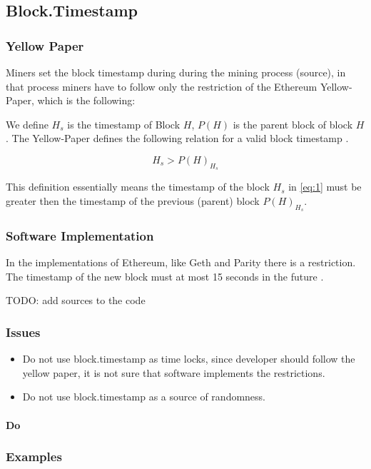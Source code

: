 \subsection{Block.Timestamp}

\subsubsection{Yellow Paper}

Miners set the block timestamp during during the mining process (source), in
that process miners have to follow only the restriction of the Ethereum
Yellow-Paper, which is the following:

We define $H_s$ is the timestamp of Block $H$, $P(H)$ is the parent
block of block $H$. The Yellow-Paper defines the following relation for a valid
block timestamp \cite{ethyellowpaper2023}.

\begin{equation} \label{eq:1}
H_s > P(H)_{H_s}
\end{equation}

This definition essentially means the timestamp of the block $H_s$ in
\ref{eq:1} must be greater then the timestamp of the previous (parent) block
$P(H)_{H_s}$.

\subsubsection{Software Implementation}

In the implementations of Ethereum, like Geth and Parity there is a
restriction. The timestamp of the new block must at most 15 seconds in the
future \cite{Conkas2021}. \newline

TODO: add sources to the code

\subsubsection{Issues}

\begin{itemize}
\item Do not use block.timestamp as time locks, since developer should follow the yellow paper, it is not sure that software implements the restrictions.
\item Do not use block.timestamp as a source of randomness.
\end{itemize}


\paragraph{Do }

\subsubsection{Examples} 
